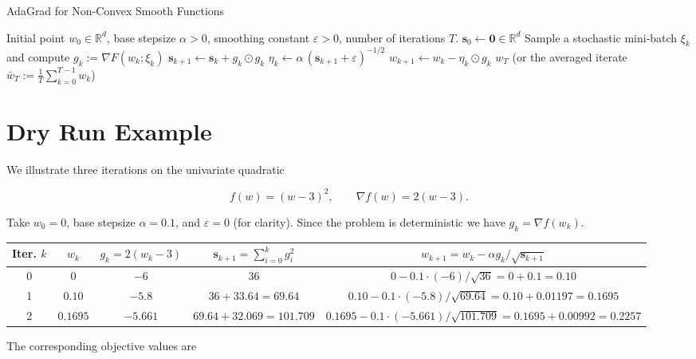 \documentclass{article}
\begin{document}
\begin{algorithm}[H]
\caption{AdaGrad for Non‑Convex Smooth Functions}
\begin{algorithmic}[1]
\Require Initial point $w_{0}\in\mathbb{R}^{d}$, base stepsize $\alpha>0$, 
        smoothing constant $\varepsilon>0$, number of iterations $T$.
\State $\mathbf{s}_{0}\gets \mathbf{0}\in\mathbb{R}^{d}$   
    \State Sample a stochastic mini‑batch $\xi_k$ and compute $g_k:=\nabla F(w_k;\xi_k)$
    \State $\mathbf{s}_{k+1}\gets \mathbf{s}_{k}+ g_k\odot g_k$
    \State $\eta_{k}\gets \alpha\,(\mathbf{s}_{k+1}+\varepsilon)^{-1/2}$   
    \State $w_{k+1}\gets w_{k}-\eta_{k}\odot g_{k}$
\EndFor
\State \Return $w_T$ (or the averaged iterate $\bar w_T:=\frac1T\sum_{k=0}^{T-1}w_k$)
\end{algorithmic}
\end{algorithm}

\section*{Dry Run Example}

We illustrate three iterations on the univariate quadratic  

\[
f(w)=(w-3)^{2},\qquad 
\nabla f(w)=2(w-3).
\]

Take $w_{0}=0$, base stepsize $\alpha=0.1$, and $\varepsilon=0$ (for clarity).  
Since the problem is deterministic we have $g_k=\nabla f(w_k)$.  

\begin{center}
\begin{tabular}{c|c|c|c|c}
\textbf{Iter. $k$} & $w_k$ & $g_k=2(w_k-3)$ & $\mathbf{s}_{k+1}= \sum_{i=0}^{k}g_i^{2}$ & $w_{k+1}=w_k-\alpha g_k/\sqrt{\mathbf{s}_{k+1}}$ \\
\midrule
0 & $0$ & $-6$ & $36$ & $0-0.1\cdot(-6)/\sqrt{36}=0+0.1=0.10$ \\
1 & $0.10$ & $-5.8$ & $36+33.64=69.64$ & $0.10-0.1\cdot(-5.8)/\sqrt{69.64}=0.10+0.01197=0.1695$ \\
2 & $0.1695$ & $-5.661$ & $69.64+32.069=101.709$ & $0.1695-0.1\cdot(-5.661)/\sqrt{101.709}=0.1695+0.00992=0.2257$ \\
\end{tabular}
\end{center}

The corresponding objective values are  
\end{document}

